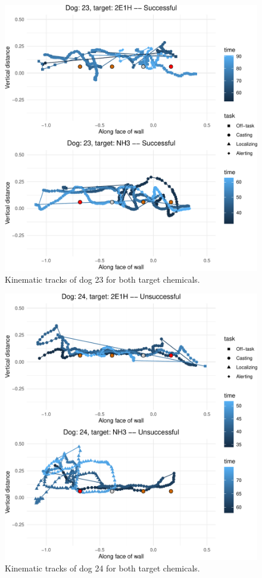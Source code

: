 \documentclass[
]{article}
\begin{document}
\begin{figure}
\centering
\includegraphics{supplementary-info_files/figure-latex/dog-23-1.pdf}
\caption{\label{fig:dog-23}Kinematic tracks of dog 23 for both target chemicals.}
\end{figure}

\begin{figure}
\centering
\includegraphics{supplementary-info_files/figure-latex/dog-24-1.pdf}
\caption{\label{fig:dog-24}Kinematic tracks of dog 24 for both target chemicals.}
\end{figure}
\end{document}
